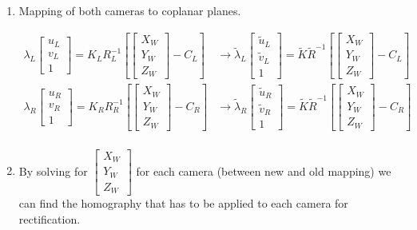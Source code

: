\documentclass[10pt,a4paper]{scrartcl}
\begin{document}
\begin{multicols*}{2}
\begin{enumerate}

\item Mapping of both cameras to coplanar planes.

\begin{align*}
\lambda_L\begin{bmatrix}
u_L\\v_L\\1
\end{bmatrix}=K_LR_L^{-1}\left[\begin{bmatrix}
X_W\\Y_W\\Z_W
\end{bmatrix}-C_L\right]&\rightarrow
\tilde{\lambda}_L\begin{bmatrix}
\tilde{u}_L\\\tilde{v}_L\\1
\end{bmatrix}=\tilde{K}\tilde{R}^{-1}\left[\begin{bmatrix}
X_W\\Y_W\\Z_W
\end{bmatrix}-C_L\right]\\
\lambda_R\begin{bmatrix}
u_R\\v_R\\1
\end{bmatrix}=K_RR_R^{-1}\left[\begin{bmatrix}
X_W\\Y_W\\Z_W
\end{bmatrix}-C_R\right]&\rightarrow
\tilde{\lambda}_R\begin{bmatrix}
\tilde{u}_R\\\tilde{v}_R\\1
\end{bmatrix}=\tilde{K}\tilde{R}^{-1}\left[\begin{bmatrix}
X_W\\Y_W\\Z_W
\end{bmatrix}-C_R\right]\\
\end{align*}
\item By solving for $\begin{bmatrix}
X_W\\Y_W\\Z_W
\end{bmatrix}$ for each camera (between new and old mapping) we can find the homography that has to be applied to each camera for rectification.


\end{enumerate}
\end{multicols*}
\end{document}
